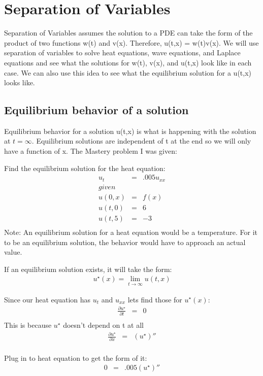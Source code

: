 \documentclass{article}
\newcommand{\bea}{\begin{eqnarray*}}
\newcommand{\eea}{\end{eqnarray*}}
\newcommand{\red}[1]{\textcolor{red}{#1}}
\begin{document}
\section{Separation of Variables}
Separation of Variables assumes the solution to a PDE can take the form of the product of two functions w(t) and v(x). Therefore, u(t,x) = w(t)v(x). We will use separation of variables to solve heat equations, wave equations, and Laplace equations and see what the solutions for w(t), v(x), and u(t,x) look like in each case. We can also use this idea to see what the equilibrium solution for a u(t,x) looks like. 
\subsection{Equilibrium behavior of a solution}

Equilibrium behavior for a solution u(t,x) is what is happening with the solution at $t=\infty$. Equilibrium solutions are independent of t at the end so we will only have a function of x. \newline
The Mastery problem I was given: 

Find the equilibrium solution for the heat equation:
\bea
u_t &=& .005 u_{xx} \\
given \\
u(0,x) &=& f(x) \\
u(t,0) &=& 6 \\
u(t,5) &=& -3 \\
\eea
Note: An equilibrium solution for a heat equation would be a temperature. For it to be an equilibrium solution, the behavior would have to approach an actual value.\newline

If an equilibrium solution exists, it will take the form:
\bea
u^{\star}(x) = \lim_{t\to\infty} u(t,x) 
\eea

Since our heat equation has $u_t$ and $u_{xx}$ lets find those for $u^{\star}(x)$:
\bea
\frac{\partial u^{\star} }{\partial t} &=& 0 \\
\eea
This is because $u^{\star}$ doesn't depend on t at all
\bea
\frac{\partial u^{\star} }{\partial x} &=& (u^{\star})'' \\
\eea

Plug in to heat equation to get the form of it:
\bea
0 &=& .005(u^{\star})''
\eea
\end{document}
